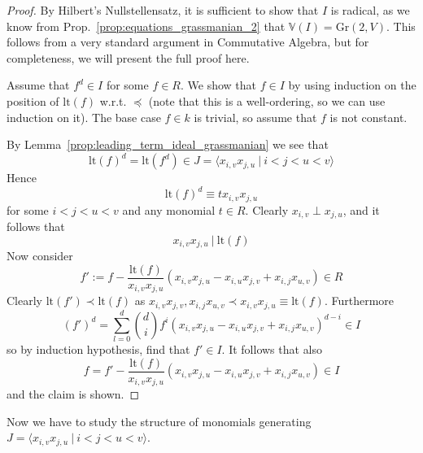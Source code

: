 \documentclass{scrartcl}
\newcommand{\V}{\mathbb{V}}
\newcommand{\Gr}{\mathrm{Gr}}
\newcommand{\divides}{\ | \ }
\theoremstyle{definition}
\begin{document}
\begin{proof}
    By Hilbert's Nullstellensatz, it is sufficient to show that $I$ is radical, as we know from Prop.~\ref{prop:equations_grassmanian_2} that $\V(I) = \Gr(2, V)$.
    This follows from a very standard argument in Commutative Algebra, but for completeness, we will present the full proof here.

    Assume that $f^d \in I$ for some $f \in R$.
    We show that $f \in I$ by using induction on the position of $\mathrm{lt}(f)$ w.r.t. $\preceq$ (note that this is a well-ordering, so we can use induction on it).
    The base case $f \in k$ is trivial, so assume that $f$ is not constant.
    
    By Lemma~\ref{prop:leading_term_ideal_grassmanian} we see that
    \begin{equation*}
        \mathrm{lt}(f)^d = \mathrm{lt}(f^d) \in J = \langle x_{i, v} x_{j, u} \ | \ i < j < u < v \rangle
    \end{equation*}
    Hence
    \begin{equation*}
        \mathrm{lt}(f)^d \equiv t x_{i, v} x_{j, u}
    \end{equation*}
    for some $i < j < u < v$ and any monomial $t \in R$.
    Clearly $x_{i, v} \perp x_{j, u}$, and it follows that
    \begin{equation*}
        x_{i, v} x_{j, u} \divides \mathrm{lt}(f)
    \end{equation*}
    Now consider
    \begin{equation*}
        f' := f - \frac {\mathrm{lt}(f)} {x_{i, v} x_{j, u}} (x_{i, v} x_{j, u} - x_{i, u} x_{j, v} + x_{i, j} x_{u, v}) \in R
    \end{equation*}
    Clearly $\mathrm{lt}(f') \prec \mathrm{lt}(f)$ as $x_{i, v} x_{j, v}, x_{i, j} x_{u, v} \prec x_{i, v} x_{j, u} \equiv \mathrm{lt}(f)$.
    Furthermore
    \begin{equation*}
        (f')^d = \sum_{l = 0}^d {d \choose i} f^i (x_{i, v} x_{j, u} - x_{i, u} x_{j, v} + x_{i, j} x_{u, v})^{d - i} \in I
    \end{equation*}
    so by induction hypothesis, find that $f' \in I$.
    It follows that also
    \begin{equation*}
        f = f'  - \frac {\mathrm{lt}(f)} {x_{i, v} x_{j, u}} (x_{i, v} x_{j, u} - x_{i, u} x_{j, v} + x_{i, j} x_{u, v}) \in I
    \end{equation*}
    and the claim is shown.
\end{proof}
Now we have to study the structure of monomials generating $J = \langle x_{i, v} x_{j, u} \ | \ i < j < u < v \rangle$.
\end{document}
